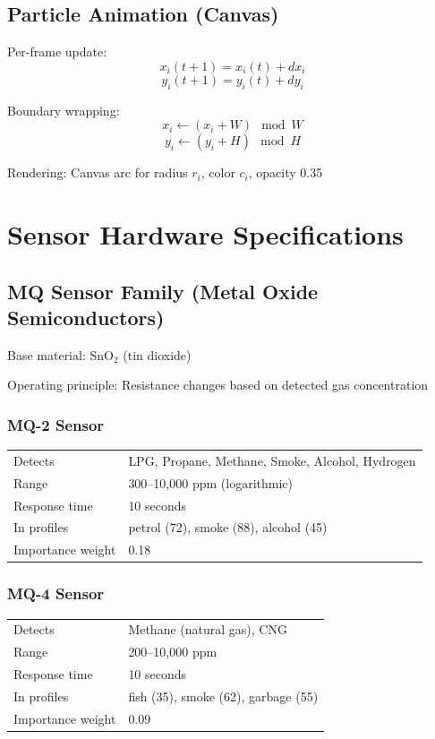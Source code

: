 \documentclass[12pt,a4paper]{article}
\begin{document}
\subsection{Particle Animation (Canvas)}

Per-frame update:
$$x_i(t+1) = x_i(t) + dx_i$$
$$y_i(t+1) = y_i(t) + dy_i$$

Boundary wrapping:
$$x_i \gets (x_i + W) \mod W$$
$$y_i \gets (y_i + H) \mod H$$

Rendering: Canvas arc for radius $r_i$, color $c_i$, opacity 0.35

\section{Sensor Hardware Specifications}

\subsection{MQ Sensor Family (Metal Oxide Semiconductors)}

Base material: SnO$_2$ (tin dioxide)

Operating principle: Resistance changes based on detected gas concentration

\subsubsection{MQ-2 Sensor}

\begin{tabular}{ll}
Detects & LPG, Propane, Methane, Smoke, Alcohol, Hydrogen \\
Range & 300–10,000 ppm (logarithmic) \\
Response time & 10 seconds \\
In profiles & petrol (72), smoke (88), alcohol (45) \\
Importance weight & 0.18 \\
\end{tabular}

\subsubsection{MQ-4 Sensor}

\begin{tabular}{ll}
Detects & Methane (natural gas), CNG \\
Range & 200–10,000 ppm \\
Response time & 10 seconds \\
In profiles & fish (35), smoke (62), garbage (55) \\
Importance weight & 0.09 \\
\end{tabular}
\end{document}
